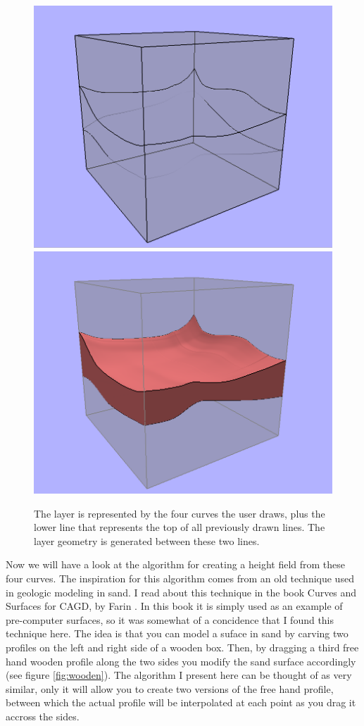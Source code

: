\documentclass[a4paper,12pt]{report}
\begin{document}
\begin{figure}
\includegraphics[width=.5\linewidth]{thesis/layerRepresentation1.png}
\includegraphics[width=.5\linewidth]{thesis/layerRepresentation2.png}
 \caption{The layer is represented by the four curves the user draws, plus the lower line that represents the top of all previously drawn lines. The layer geometry is generated between these two lines.}
 \label{fig:layerRep}
\end{figure}


Now we will have a look at the algorithm for creating a height field from these four curves. The inspiration for this algorithm comes from an old technique used in geologic modeling in sand. I read about this technique in the book Curves and Surfaces for CAGD, by Farin \cite{farin2001curves}. In this book it is simply used as an example of pre-computer surfaces, so it was somewhat of a concidence that I found this technique here. The idea is that you can model a suface in sand by carving two profiles on the left and right side of a wooden box. Then, by dragging a third free hand wooden profile along the two sides you modify the sand surface accordingly (see figure \ref{fig:wooden}). The algorithm I present here can be thought of as very similar, only it will allow you to create two versions of the free hand profile, between which the actual profile will be interpolated at each point as you drag it accross the sides.
\end{document}
